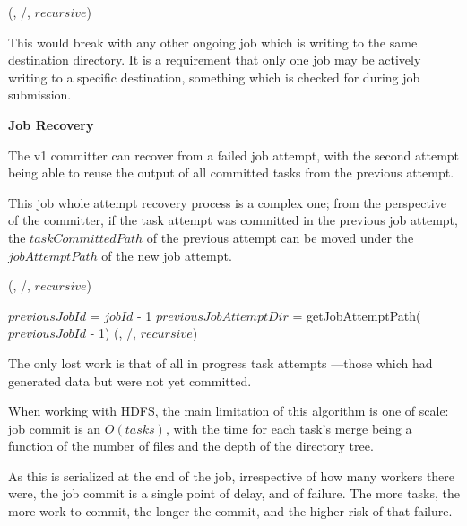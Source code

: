 \documentclass[conference]{IEEEtran}
\begin{document}
\begin{procedure}
\FileOutputCommitVars

  \delete(\fs, \dest/\temp, $recursive$)\;

\caption{cleanupJob()}
\label{alg:v1.cleanupJob}
\end{procedure}

This would break with any other ongoing job which is writing to the
same destination directory.
It is a requirement that only one job may be actively writing
to a specific destination, something which is checked for during job submission.


\textbf{Job Recovery}

The v1 committer can recover from a failed job attempt, with the
second attempt being able to reuse the output of all committed tasks from
the previous attempt.

This job whole attempt recovery process is a complex one;
from the perspective of the committer, if the task attempt was committed
in the previous job attempt, the $taskCommittedPath$ of the previous attempt
can be moved under the $jobAttemptPath$ of the new job attempt.


\begin{procedure}
\FileOutputCommitVars

  \delete(\fs, \dest/\temp, $recursive$)\;

\caption{isRecoverySupported()}
\label{alg:v1.isRecoverySupported}
\end{procedure}


\begin{procedure}
\FileOutputCommitVars

  $previousJobId$ = $jobId$ - 1
  $previousJobAttemptDir$ = getJobAttemptPath($previousJobId$ - 1)
  \delete(\fs, \dest/\temp, $recursive$)\;

\caption{recoverTask(TaskAttemptContext )}
\label{alg:v1.recoverTask}
\end{procedure}


The only lost work is that of all in progress task attempts ---those which had generated
data but were not yet committed.

When working with HDFS, the main limitation of this algorithm is
one of scale: job commit is an $O(tasks)$, with the time for
each task's merge being a function of the number of files and the depth of
the directory tree.

As this is serialized at the end of the job, irrespective of how many workers
there were, the job commit is a single point of delay, and of failure.
The more tasks, the more work to commit, the longer the commit, and the
higher risk of that failure.
\end{document}
